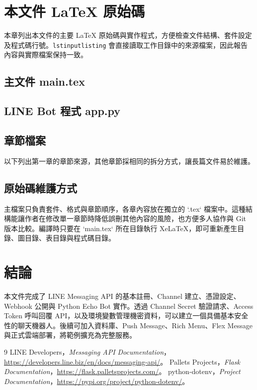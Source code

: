 \chapter{本文件 LaTeX 原始碼}

本章列出本文件的主要 LaTeX 原始碼與實作程式，方便檢查文件結構、套件設定及程式碼行號。\texttt{lstinputlisting} 會直接讀取工作目錄中的來源檔案，因此報告內容與實際檔案保持一致。

\section{主文件 main.tex}


\section{LINE Bot 程式 app.py}


\section{章節檔案}
以下列出第一章的章節來源，其他章節採相同的拆分方式，讓長篇文件易於維護。


\section{原始碼維護方式}
主檔案只負責套件、格式與章節順序，各章內容放在獨立的 `.tex` 檔案中。這種結構能讓作者在修改單一章節時降低誤刪其他內容的風險，也方便多人協作與 Git 版本比較。編譯時只要在 `main.tex` 所在目錄執行 XeLaTeX，即可重新產生目錄、圖目錄、表目錄與程式碼目錄。

\chapter*{結論}
本文件完成了 LINE Messaging API 的基本註冊、Channel 建立、憑證設定、Webhook 公開與 Python Echo Bot 實作。透過 Channel Secret 驗證請求、Access Token 呼叫回覆 API，以及環境變數管理機密資料，可以建立一個具備基本安全性的聊天機器人。後續可加入資料庫、Push Message、Rich Menu、Flex Message 與正式雲端部署，將範例擴充為完整服務。

\begin{thebibliography}{9}
 LINE Developers，\textit{Messaging API Documentation}，\url{https://developers.line.biz/en/docs/messaging-api/}。
 Pallets Projects，\textit{Flask Documentation}，\url{https://flask.palletsprojects.com/}。
 python-dotenv，\textit{Project Documentation}，\url{https://pypi.org/project/python-dotenv/}。
\end{thebibliography}
